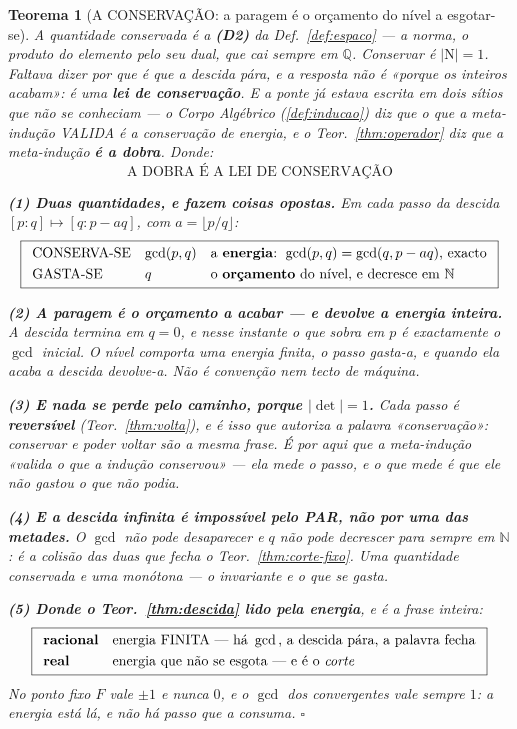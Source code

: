 \documentclass[11pt,a4paper]{article}
\newtheorem{teorema}{Teorema}
\newcommand{\abs}[1]{\lvert #1\rvert}
\begin{document}
\begin{teorema}[A CONSERVAÇÃO: a paragem é o orçamento do nível a esgotar-se]\label{thm:conservacao}
\emph{A quantidade conservada é a} \textbf{(D2)} \emph{da Def.~\ref{def:espaco}} --- a
norma, o produto do elemento pelo seu dual, que cai sempre em $\mathbb{Q}$. Conservar é
$\abs{\mathrm{N}}=1$.
Faltava dizer \emph{por que} é que a descida pára, e a resposta não é «porque os inteiros
acabam»: é uma \textbf{lei de conservação}. E a ponte já estava escrita em dois sítios que
não se conheciam --- o \emph{Corpo Algébrico} (\ref{def:inducao}) diz que \emph{o que
a meta-indução VALIDA é a conservação de energia}, e o Teor.~\ref{thm:operador} diz que a
meta-indução \textbf{é a dobra}. Donde:
\[
\boxed{\;\text{A DOBRA É A LEI DE CONSERVAÇÃO}\;}
\]

\textbf{(1) Duas quantidades, e fazem coisas opostas.} Em cada passo da descida
$[p{:}q]\mapsto[q:p-aq]$, com $a=\lfloor p/q\rfloor$:
\[
\boxed{
\begin{array}{lll}
\text{CONSERVA-SE} & \gcd(p,q) & \text{a \textbf{energia}: }\gcd(p,q)=\gcd(q,p-aq)\text{,
exacto}\\[3pt]
\text{GASTA-SE} & q & \text{o \textbf{orçamento} do nível, e decresce em }\mathbb{N}
\end{array}}
\]

\textbf{(2) A paragem é o orçamento a acabar --- e devolve a energia inteira.} A descida
termina em $q=0$, e nesse instante o que sobra em $p$ é \emph{exactamente} o
$\gcd$ inicial. \emph{O nível comporta uma energia finita, o passo gasta-a, e quando ela
acaba a descida devolve-a.} Não é convenção nem tecto de máquina.

\textbf{(3) E nada se perde pelo caminho, porque $\abs{\det}=1$.} Cada passo é
\textbf{reversível} (Teor.~\ref{thm:volta}), e é isso que autoriza a palavra
«conservação»: \emph{conservar e poder voltar são a mesma frase}. É por aqui que a
meta-indução «valida o que a indução conservou» --- ela mede o passo, e o que mede é que
ele não gastou o que não podia.

\textbf{(4) E a descida infinita é impossível pelo PAR, não por uma das metades.} O
$\gcd$ não pode desaparecer e $q$ não pode decrescer para sempre em $\mathbb{N}$: é a
colisão das duas que fecha o Teor.~\ref{thm:corte-fixo}. Uma quantidade conservada e uma
monótona --- \emph{o invariante e o que se gasta}.

\textbf{(5) Donde o Teor.~\ref{thm:descida} lido pela energia}, e é a frase inteira:
\[
\boxed{
\begin{array}{ll}
\text{\textbf{racional}} & \text{energia FINITA --- há }\gcd\text{, a descida pára, a
palavra fecha}\\[3pt]
\text{\textbf{real}} & \text{energia que não se esgota --- e é o \emph{corte}}
\end{array}}
\]
No ponto fixo $F$ vale $\pm1$ e nunca $0$, e o $\gcd$ dos convergentes vale sempre $1$:
\emph{a energia está lá, e não há passo que a consuma}. $\square$
\end{teorema}
\end{document}
